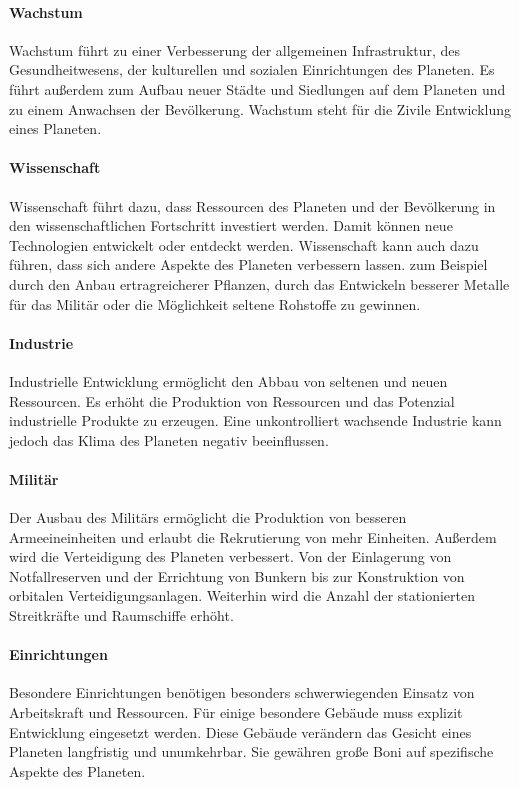 \documentclass[11pt, a4paper]{article}
\begin{document}
\paragraph{Wachstum}
Wachstum führt zu einer Verbesserung der allgemeinen Infrastruktur, des Gesundheitwesens, der kulturellen und sozialen
Einrichtungen des Planeten. Es führt außerdem zum Aufbau neuer Städte und Siedlungen auf dem Planeten und zu einem
Anwachsen der Bevölkerung. Wachstum steht für die Zivile Entwicklung eines Planeten.
%
\paragraph{Wissenschaft}
Wissenschaft führt dazu, dass Ressourcen des Planeten und der Bevölkerung in den wissenschaftlichen Fortschritt
investiert werden. Damit können neue Technologien entwickelt oder entdeckt werden. Wissenschaft kann auch dazu
führen, dass sich andere Aspekte des Planeten verbessern lassen. zum Beispiel durch den Anbau ertragreicherer
Pflanzen, durch das Entwickeln besserer Metalle für das Militär oder die Möglichkeit seltene Rohstoffe zu gewinnen.

\paragraph{Industrie}
Industrielle Entwicklung ermöglicht den Abbau von seltenen und neuen Ressourcen. Es erhöht die Produktion von
Ressourcen und das Potenzial industrielle Produkte zu erzeugen. Eine unkontrolliert wachsende Industrie kann
jedoch das Klima des Planeten negativ beeinflussen.
%
\paragraph{Militär}
Der Ausbau des Militärs ermöglicht die Produktion von besseren Armeeineinheiten und erlaubt die Rekrutierung
von mehr Einheiten. Außerdem wird die Verteidigung des Planeten verbessert. Von der Einlagerung von
Notfallreserven und der Errichtung von Bunkern bis zur Konstruktion von orbitalen Verteidigungsanlagen.
Weiterhin wird die Anzahl der stationierten Streitkräfte und Raumschiffe erhöht.
%
\paragraph{Einrichtungen}
Besondere Einrichtungen benötigen besonders schwerwiegenden Einsatz von Arbeitskraft und Ressourcen.
Für einige besondere Gebäude muss explizit Entwicklung eingesetzt werden. Diese Gebäude verändern das Gesicht
eines Planeten langfristig und unumkehrbar. Sie gewähren große Boni auf spezifische Aspekte des Planeten.
%
\end{document}
